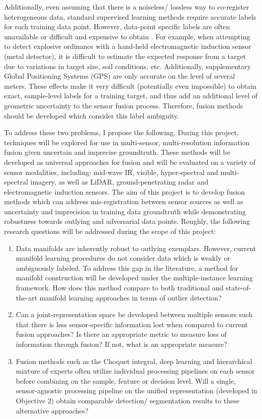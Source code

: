 Additionally, even assuming that there is a noiseless/ lossless way to co-register heterogeneous data, standard supervised learning methods require accurate labels for each training data point.  However, data-point specific labels are often unavailable or difficult and expensive to obtain \cite{Du2018MultiResolutionSensorFusion,Du2019MIChoquetIntegral}.  For example, when attempting to detect explosive ordinance with a hand-held electromagnetic induction sensor (metal detector), it is difficult to estimate the expected response from a target due to variations in target size, soil conditions, etc.   Additionally, supplementary Global Positioning Systems (GPS) are only accurate on the level of several meters. These effects make it very difficult (potentially even impossible) to obtain exact, sample-level labels for a training target, and thus add an additional level of geometric uncertainty to the sensor fusion process.  Therefore, fusion methods should be developed which consider this label ambiguity.
\newline

To address these two problems, I propose the following.  During this project, techniques will be explored for use in multi-sensor, multi-resolution information fusion given uncertain and imprecise groundtruth.  These methods will be developed as universal approaches for fusion and will be evaluated on a variety of sensor modalities, including: mid-wave IR, visible, hyper-spectral and multi-spectral imagery, as well as LiDAR, ground-penetrating radar and electromagnetic induction sensors.  The aim of this project is to develop fusion methods which can address mis-registration between sensor sources as well as uncertainty and imprecision in training data groundtruth while demonstrating robustness towards outlying and adversarial data points. Roughly, the following research questions will be addressed during the scope of this project:
\begin{enumerate}
	\item Data manifolds are inherently robust to outlying exemplars.  However, current manifold learning procedures do not consider data which is weakly or ambiguously labeled.  To address this gap in the literature, a method for manifold construction will be developed under the multiple-instance learning framework.  How does this method compare to both traditional and state-of-the-art manifold learning approaches in terms of outlier detection?
	\item Can a joint-representation space be developed between multiple sensors such that there is less sensor-specific information lost when compared to current fusion approaches? Is there an appropriate metric to measure loss of information through fusion?  If not, what is an appropriate measure?
	\item Fusion methods such as the Choquet integral, deep learning and hierarchical mixture of experts often utilize individual processing pipelines on each sensor before combining on the sample, feature or decision level.  Will a single, sensor-agnostic processing pipeline on the unified representation (developed in Objective 2) obtain comparable detection/ segmentation results to these alternative approaches?
\end{enumerate} 

